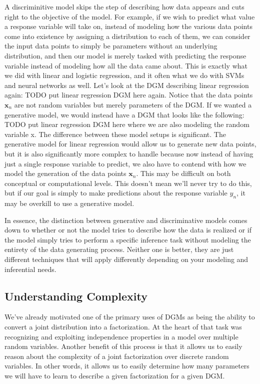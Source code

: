 A discriminitive model skips the step of describing how data appears and cuts right to the objective of the model. For example, if we wish to predict what value a response variable will take on, instead of modeling how the various data points come into existence by assigning a distribution to each of them, we can consider the input data points to simply be parameters without an underlying distribution, and then our model is merely tasked with predicting the response variable instead of modeling how all the data came about. This is exactly what we did with linear and logistic regression, and it often what we do with SVMs and neural networks as well. Let's look at the DGM describing linear regression again:
TODO put linear regression DGM here again.
Notice that the data points $\textbf{x}_n$ are not random variables but merely parameters of the DGM. If we wanted a generative model, we would instead have a DGM that looks like the following:
TODO put linear regression DGM here where we are also modeling the random variable x.
The difference between these model setups is significant. The generative model for linear regression would allow us to generate new data points, but it is also significantly more complex to handle because now instead of having just a single response variable to predict, we also have to contend with how we model the generation of the data points $\textbf{x}_n$. This may be difficult on both conceptual or computational levels. This doesn't mean we'll never try to do this, but if our goal is simply to make predictions about the response variable $y_n$, it may be overkill to use a generative model.

In essence, the distinction between generative and discriminative models comes down to whether or not the model tries to describe how the data is realized or if the model simply tries to perform a specific inference task without modeling the entirety of the data generating process. Neither one is better, they are just different techniques that will apply differently depending on your modeling and inferential needs.

\subsection{Understanding Complexity}
We've already motivated one of the primary uses of DGMs as being the ability to convert a joint distribution into a factorization. At the heart of that task was recognizing and exploiting independence properties in a model over multiple random variables. Another benefit of this process is that it allows us to easily reason about the complexity of a joint factorization over discrete random variables. In other words, it allows us to easily determine how many parameters we will have to learn to describe a given factorization for a given DGM.

